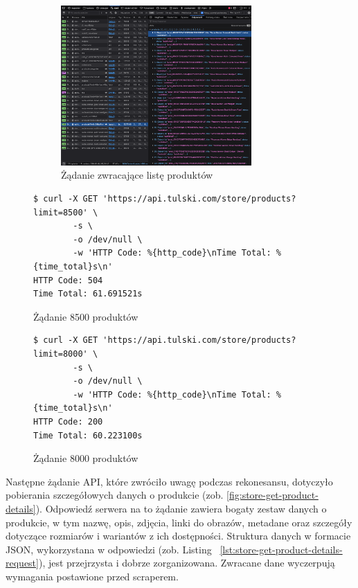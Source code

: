 \begin{figure}[p]
    \begin{figure}[H]
        \centering
        \includegraphics[width=0.8\textwidth]{img/store-get-products-list}
        \caption{Żądanie zwracające listę produktów}
        \label{fig:store-get-products-list}
    \end{figure}
    \begin{listing}[H]
        \begin{verbatim}
$ curl -X GET 'https://api.tulski.com/store/products?limit=8500' \
        -s \
        -o /dev/null \
        -w 'HTTP Code: %{http_code}\nTime Total: %{time_total}s\n'
HTTP Code: 504
Time Total: 61.691521s
        \end{verbatim}
        \caption{Żądanie 8500 produktów}
        \label{lst:store-get-products-list-8500}
    \end{listing}
    \begin{listing}[H]
        \begin{verbatim}
$ curl -X GET 'https://api.tulski.com/store/products?limit=8000' \
        -s \
        -o /dev/null \
        -w 'HTTP Code: %{http_code}\nTime Total: %{time_total}s\n'
HTTP Code: 200
Time Total: 60.223100s
        \end{verbatim}
        \caption{Żądanie 8000 produktów}
        \label{lst:store-get-products-list-8000}
    \end{listing}
\end{figure}

\newpage

Następne żądanie API, które zwróciło uwagę podczas rekonesansu, dotyczyło pobierania szczegółowych danych o produkcie (zob. \autoref{fig:store-get-product-details}).
Odpowiedź serwera na to żądanie zawiera bogaty zestaw danych o produkcie, w tym nazwę, opis, zdjęcia, linki do obrazów, metadane oraz szczegóły dotyczące rozmiarów i wariantów z ich dostępności.
Struktura danych w formacie JSON, wykorzystana w odpowiedzi (zob. Listing ~\autoref{lst:store-get-product-details-request}), jest przejrzysta i dobrze zorganizowana.
Zwracane dane wyczerpują wymagania postawione przed scraperem.

